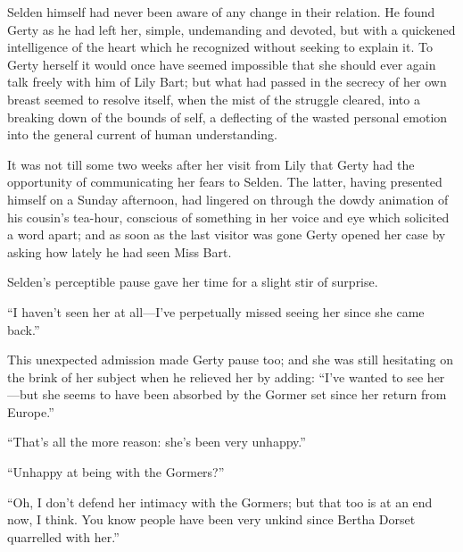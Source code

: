 \documentclass[12pt,a4paper]{book}
\begin{document}
Selden himself had never been aware of any change in their
relation. He found Gerty as he had left her, simple, undemanding
and devoted, but with a quickened intelligence of the heart which
he recognized without seeking to explain it. To Gerty herself it
would once have seemed impossible that she should ever again talk
freely with him of Lily Bart; but what had passed in the secrecy
of her own breast seemed to resolve itself, when the mist of the
struggle cleared, into a breaking down of the bounds of self, a
deflecting of the wasted personal emotion into the general
current of human understanding.





It was not till some two weeks after her visit from Lily that
Gerty had the opportunity of communicating her fears to Selden. 
The latter, having presented himself on a Sunday afternoon, had
lingered on through the dowdy animation of his cousin's
tea-hour, conscious of something in her voice and eye which
solicited a word apart; and as soon as the last visitor was gone
Gerty opened her case by asking how lately he had seen Miss Bart.





Selden's perceptible pause gave her time for a slight stir of
surprise.





``I haven't seen her at all---I've perpetually missed seeing her
since she came back.''





This unexpected admission made Gerty pause too; and she was still
hesitating on the brink of her subject when he relieved her by
adding: ``I've wanted to see her---but she seems to have been
absorbed by the Gormer set since her return from Europe.''





``That's all the more reason: she's been very unhappy.''





``Unhappy at being with the Gormers?''





``Oh, I don't defend her intimacy with the Gormers; but that too
is at an end now, I think. You know people have been very unkind
since Bertha Dorset quarrelled with her.''
\end{document}
